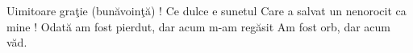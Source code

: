 Uimitoare graţie (bunăvoinţă) !
Ce dulce e sunetul
Care a salvat un nenorocit ca mine !
Odată am fost pierdut,
dar acum m-am regăsit
Am fost orb, dar acum văd. 
